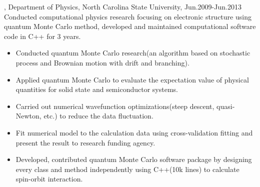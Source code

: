 \documentclass[11pt]{article} %
\begin{document}
, Department of Physics, North Carolina State University, Jun.2009-Jun.2013\\
\noindent Conducted computational physics research focusing on electronic structure using quantum Monte Carlo method, developed and maintained computational software code in C++ for 3 years.\\
\begin{itemize}
 \item Conducted quantum Monte Carlo research(an algorithm based on stochastic process and Brownian motion with drift and branching).\\
\vspace{-4mm}
  \item Applied quantum Monte Carlo to evaluate the expectation value of physical quantities for solid state and semiconductor systems. \\

\vspace{-4mm}
  \item Carried out numerical wavefunction optimizations(steep descent, quasi-Newton, etc.) to reduce the data fluctuation. \\
  \vspace{-4mm}
  \item Fit numerical model to the calculation data using cross-validation fitting and present the result to research funding agency.
  \item Developed, contributed quantum Monte Carlo software package by designing every class and method independently using C++(10k lines) to calculate spin-orbit interaction.\\


\end{itemize}
\end{document}
